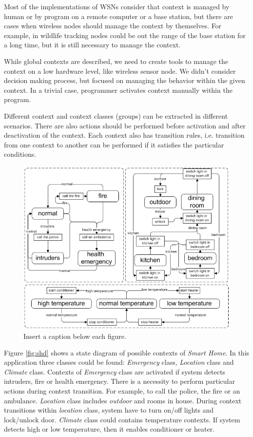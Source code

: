 \documentclass{ubicomp-ext}
\begin{document}
Most of the implementations of WSNs consider that context is managed by human or by program on a remote computer or a base station, but there are cases when wireless nodes should manage the context by themselves. For example, in wildlife tracking nodes could be out the range of the base station for a long time, but it is still necessary to manage the context.

While global contexts are described, we need to create tools to manage the context on a low hardware level, like wireless sensor node. We didn't consider decision making process, but focused on managing the behavior within the given context. In a trivial case, programmer activates context manually within the program.

Different context and context classes (groups) can be extracted in different scenarios. There are also actions should be performed before activation and after deactivation of the context. Each context also has transition rules, i.e. transition from one context to another can be performed if it satisfies the particular conditions.

\begin{figure}
  \centering
  \includegraphics[width=\linewidth]{smarthome.png}
  \caption{Insert a caption below each figure.}
  \label{fig:smarthome}
\end{figure}

Figure \ref{fig:shd} shows a state diagram of possible contexts of \textit{Smart Home}. In this application three classes could be found: \textit{Emergency} class, \textit{Location} class and \textit{Climate} class. Contexts of \textit{Emergency} class are activated if system detects intruders, fire or health emergency. There is a necessity to perform particular actions during context transition. For example, to call the police, the fire or an ambulance. \textit{Location} class includes \textit{outdoor} and rooms in house. During context transitions within \textit{location} class, system have to turn on/off lights and lock/unlock door. \textit{Climate} class could contains temperature contexts. If system detects high or low temperature, then it enables conditioner or heater.
\end{document}
